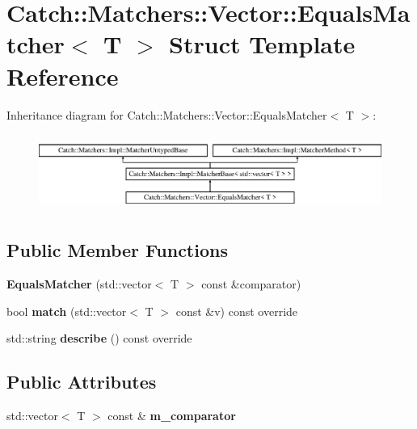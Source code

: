 \hypertarget{struct_catch_1_1_matchers_1_1_vector_1_1_equals_matcher}{}\section{Catch\+:\+:Matchers\+:\+:Vector\+:\+:Equals\+Matcher$<$ T $>$ Struct Template Reference}
\label{struct_catch_1_1_matchers_1_1_vector_1_1_equals_matcher}
Inheritance diagram for Catch\+:\+:Matchers\+:\+:Vector\+:\+:Equals\+Matcher$<$ T $>$\+:\begin{figure}[H]
\begin{center}
\leavevmode
\includegraphics[height=2.514970cm]{struct_catch_1_1_matchers_1_1_vector_1_1_equals_matcher}
\end{center}
\end{figure}
\subsection*{Public Member Functions}
\begin{DoxyCompactItemize}
\item 
\mbox{\label{struct_catch_1_1_matchers_1_1_vector_1_1_equals_matcher_a3846c47780d1991dcfe87aefded98008}} 
{\bfseries Equals\+Matcher} (std\+::vector$<$ T $>$ const \&comparator)
\item 
\mbox{\label{struct_catch_1_1_matchers_1_1_vector_1_1_equals_matcher_a2d96cca58a44151fddc5257eda3305da}} 
bool {\bfseries match} (std\+::vector$<$ T $>$ const \&v) const override
\item 
\mbox{\label{struct_catch_1_1_matchers_1_1_vector_1_1_equals_matcher_a36b5f7ecada4081d6c65bebe8ddea6f4}} 
std\+::string {\bfseries describe} () const override
\end{DoxyCompactItemize}
\subsection*{Public Attributes}
\begin{DoxyCompactItemize}
\item 
\mbox{\label{struct_catch_1_1_matchers_1_1_vector_1_1_equals_matcher_a56f7aa6f110a12b1b9aeb0cabbc9d755}} 
std\+::vector$<$ T $>$ const  \& {\bfseries m\+\_\+comparator}
\end{DoxyCompactItemize}

